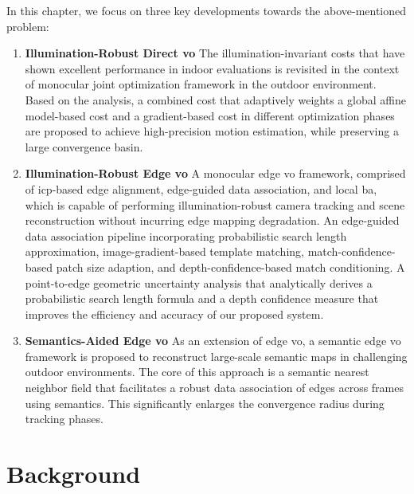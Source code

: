 In this chapter, we focus on three key developments towards the above-mentioned problem: 
\begin{enumerate}
	\item \textbf{Illumination-Robust Direct \acrshort{vo}} The illumination-invariant costs that have shown excellent performance in indoor evaluations is revisited in the context of monocular joint optimization framework \cite{engel2018direct} in the outdoor environment.
Based on the analysis, a combined cost that adaptively weights a global affine model-based cost and a gradient-based cost in different optimization phases are proposed to achieve high-precision motion estimation, while preserving a large convergence basin.
	\item \textbf{Illumination-Robust Edge \acrshort{vo}} A monocular edge \acrshort{vo} framework, comprised of \acrshort{icp}-based edge alignment, edge-guided data association, and local \acrshort{ba}, which is capable of performing illumination-robust camera tracking and scene reconstruction without incurring edge mapping degradation.  
An edge-guided data association pipeline incorporating probabilistic search length approximation, image-gradient-based template matching, match-confidence-based patch size adaption, and depth-confidence-based match conditioning.
A point-to-edge geometric uncertainty analysis that analytically derives a probabilistic search length formula and a depth confidence measure that improves the efficiency and accuracy of our proposed system.
	\item \textbf{Semantics-Aided Edge \acrshort{vo}} As an extension of edge \acrshort{vo}, a semantic edge \acrshort{vo} framework is proposed to reconstruct large-scale semantic maps in challenging outdoor environments. The core of this approach is a semantic nearest neighbor field that facilitates a robust data association of edges across frames using semantics. This significantly enlarges the convergence radius during tracking phases.  
\end{enumerate}

\section{Background}


